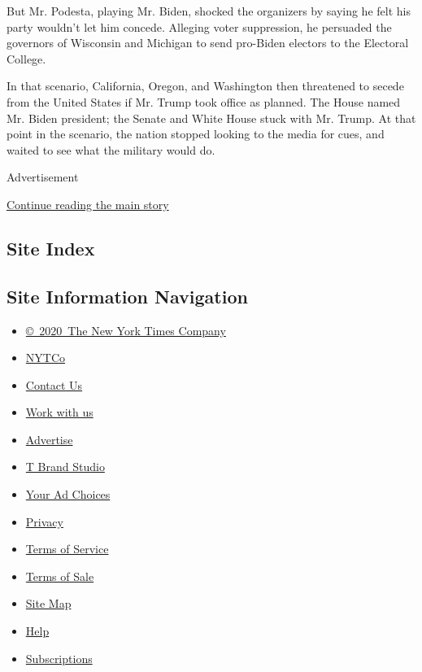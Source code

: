 But Mr. Podesta, playing Mr. Biden, shocked the organizers by saying he
felt his party wouldn't let him concede. Alleging voter suppression, he
persuaded the governors of Wisconsin and Michigan to send pro-Biden
electors to the Electoral College.

In that scenario, California, Oregon, and Washington then threatened to
secede from the United States if Mr. Trump took office as planned. The
House named Mr. Biden president; the Senate and White House stuck with
Mr. Trump. At that point in the scenario, the nation stopped looking to
the media for cues, and waited to see what the military would do.

Advertisement

\protect\hyperlink{after-bottom}{Continue reading the main story}

\hypertarget{site-index}{%
\subsection{Site Index}\label{site-index}}

\hypertarget{site-information-navigation}{%
\subsection{Site Information
Navigation}\label{site-information-navigation}}

\begin{itemize}
\tightlist
\item
  \href{https://help.nytimes3xbfgragh.onion/hc/en-us/articles/115014792127-Copyright-notice}{©~2020~The
  New York Times Company}
\end{itemize}

\begin{itemize}
\tightlist
\item
  \href{https://www.nytco.com/}{NYTCo}
\item
  \href{https://help.nytimes3xbfgragh.onion/hc/en-us/articles/115015385887-Contact-Us}{Contact
  Us}
\item
  \href{https://www.nytco.com/careers/}{Work with us}
\item
  \href{https://nytmediakit.com/}{Advertise}
\item
  \href{http://www.tbrandstudio.com/}{T Brand Studio}
\item
  \href{https://www.nytimes3xbfgragh.onion/privacy/cookie-policy\#how-do-i-manage-trackers}{Your
  Ad Choices}
\item
  \href{https://www.nytimes3xbfgragh.onion/privacy}{Privacy}
\item
  \href{https://help.nytimes3xbfgragh.onion/hc/en-us/articles/115014893428-Terms-of-service}{Terms
  of Service}
\item
  \href{https://help.nytimes3xbfgragh.onion/hc/en-us/articles/115014893968-Terms-of-sale}{Terms
  of Sale}
\item
  \href{https://spiderbites.nytimes3xbfgragh.onion}{Site Map}
\item
  \href{https://help.nytimes3xbfgragh.onion/hc/en-us}{Help}
\item
  \href{https://www.nytimes3xbfgragh.onion/subscription?campaignId=37WXW}{Subscriptions}
\end{itemize}
